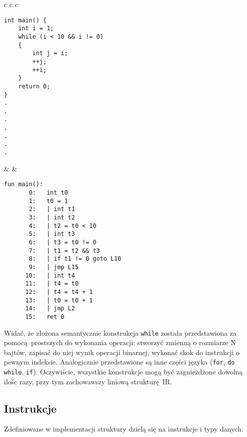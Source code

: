 		\begin{center}
		\begin{tabular}{ c c c }
\begin{lstlisting}[label={lst:warn-unused-var},linewidth=6.5cm]
int main() {
    int i = 1;
    while (i < 10 && i != 0)
    {
        int j = i;
        ++j;
        ++i;
    }
    return 0;
}			
.
.
.
.
.
.
.
\end{lstlisting}
		& &	
\begin{lstlisting}[label={lst:warn-unused-var},linewidth=8cm]
fun main():
       0:   int t0
       1:   t0 = 1
       2:   | int t1
       3:   | int t2
       4:   | t2 = t0 < 10
       5:   | int t3
       6:   | t3 = t0 != 0
       7:   | t1 = t2 && t3
       8:   | if t1 != 0 goto L10
       9:   | jmp L15
      10:   | int t4
      11:   | t4 = t0
      12:   | t4 = t4 + 1
      13:   | t0 = t0 + 1
      14:   | jmp L2
      15:   ret 0
\end{lstlisting}
		\end{tabular}
		\end{center}
		
		Widać, że złożona semantycznie konstrukcja \texttt{while} została
		przedstawiona za pomocą prostszych do wykonania operacji: stworzyć
		zmienną o rozmiarze N bajtów, zapisać do niej wynik operacji binarnej,
		wykonać skok do instrukcji o pewnym indeksie. Analogicznie przedstawione są
		inne części języka (\texttt{for}, \texttt{do while}, \texttt{if}). Oczywiście,
		wszystkie konstrukcje mogą być zagnieżdżone dowolną ilośc razy, przy tym
		zachowawszy liniową strukturę IR.

	\subsection{Instrukcje}

	Zdefiniowane w implementacji struktury dzielą się
	na instrukcje i typy danych.

